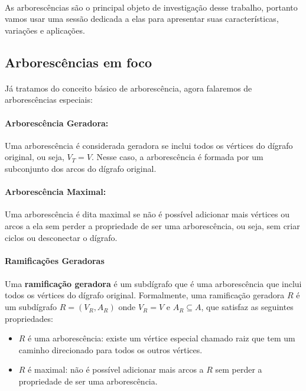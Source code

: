 \documentclass[12pt,a4paper]{article}
\begin{document}
\paragraph{}
As arborescências são o principal objeto de investigação desse trabalho, portanto vamos usar uma sessão dedicada a elas para apresentar suas características, variações e aplicações.

\subsection{Arborescências em foco}

\paragraph{}
Já tratamos do conceito básico de arborescência, agora falaremos de arborescências especiais:

\paragraph{Arborescência Geradora:}
Uma arborescência é considerada geradora se inclui todos os vértices do dígrafo original, ou seja, \(V_T = V\). Nesse caso, a arborescência é formada por um subconjunto dos arcos do dígrafo original.

\paragraph{Arborescência Maximal:}
Uma arborescência é dita maximal se não é possível adicionar mais vértices ou arcos a ela sem perder a propriedade de ser uma arborescência, ou seja, sem criar ciclos ou desconectar o dígrafo.

\paragraph{Ramificações Geradoras}
\paragraph{}Uma \textbf{ramificação geradora} é um subdígrafo que é uma arborescência que inclui todos os vértices do dígrafo original. Formalmente, uma ramificação geradora \(R\) é um subdígrafo \(R = (V_R, A_R)\) onde \(V_R = V\) e \(A_R \subseteq A\), que satisfaz as seguintes propriedades:
\begin{itemize}
    \item \(R\) é uma arborescência: existe um vértice especial chamado raiz que tem um caminho direcionado para todos os outros vértices.
    \item \(R\) é maximal: não é possível adicionar mais arcos a \(R\) sem perder a propriedade de ser uma arborescência.
\end{itemize}
\end{document}
